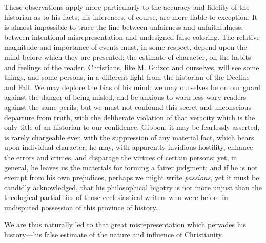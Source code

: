 These observations apply more particularly to the accuracy and fidelity of
the historian as to his facts; his inferences, of course, are more liable
to exception. It is almost impossible to trace the line between unfairness
and unfaithfulness; between intentional misrepresentation and undesigned false
coloring. The relative magnitude and importance of events must, in some respect,
depend upon the mind before which they are presented; the estimate of character,
on the habits and feelings of the reader. Christians, like M. Guizot and
ourselves, will see some things, and some persons, in a different light from
the historian of the Decline and Fall. We may deplore the bias of his mind;
we may ourselves be on our guard against the danger of being misled, and be
anxious to warn less wary readers against the same perils; but we must not
confound this secret and unconscious departure from truth, with the deliberate
violation of that veracity which is the only title of an historian to our
confidence. Gibbon, it may be fearlessly asserted, is rarely chargeable even
with the suppression of any material fact, which bears upon individual
character; he may, with apparently invidious hostility, enhance the errors
and crimes, and disparage the virtues of certain persons; yet, in general,
he leaves us the materials for forming a fairer judgment; and if he is not
exempt from his own prejudices, perhaps we might write \textit{passions},
yet it must be candidly acknowledged, that his philosophical bigotry is not
more unjust than the theological partialities of those ecclesiastical writers
who were before in undisputed possession of this province of history.

We are thus naturally led to that great misrepresentation which pervades
his history—his false estimate of the nature and influence of Christianity.

